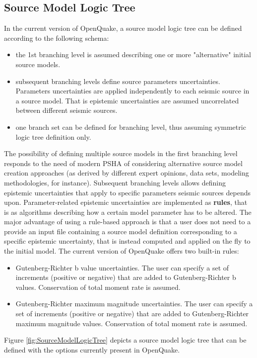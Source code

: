 \subsection{Source Model Logic Tree}
\label{hazard:source_model_logic_tree}
In the current version of OpenQuake, a source model logic tree can be defined according to the following schema:
\begin{itemize}
\item the 1st branching level is assumed describing one or more "alternative" initial source models.
\item subsequent branching levels define source parameters uncertainties. Parameters uncertainties are applied independently to each seismic source in a source model. That is epistemic uncertainties are assumed uncorrelated between different seismic sources. 
\item one branch set can be defined for branching level, thus assuming symmetric logic tree definition only.
\end{itemize}
The possibility of defining multiple source models in the first branching level responds to the need of modern PSHA of considering alternative source model creation approaches (as derived by different expert opinions, data sets, modeling methodologies, for instance). Subsequent branching levels allows defining epistemic uncertainties that apply to specific parameters seismic sources depends upon. Parameter-related epistemic uncertainties are implemented as \textbf{rules}, that is as algorithms describing how a certain model parameter has to be altered. The major advantage of using a rule-based approach is that a user does not need to a provide an input file containing a source model definition corresponding to a specific epistemic uncertainty, that is instead computed and applied on the fly to the initial model. The current version of OpenQuake offers two built-in rules:
\begin{itemize}
\item Gutenberg-Richter b value uncertainties. The user can specify a set of increments (positive or negative) that are added to Gutenberg-Richter b values. Conservation of total moment rate is assumed.
\item Gutenberg-Richter maximum magnitude uncertainties. The user can specify a set of increments (positive or negative) that are added to Gutenberg-Richter maximum magnitude values. Conservation of total moment rate is assumed.
\end{itemize}
Figure \ref{fig:SourceModelLogicTree} depicts a source model logic tree that can be defined with the options currently present in OpenQuake. 
